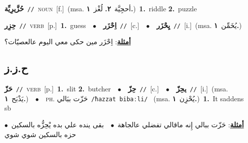 \documentclass[10pt,a4paper,twoside]{article} %
\begin{document}
\begin{multicols}{2}
{\setlength\topsep{0pt}\textbf{\foreignlanguage{arabic}{حُزَّيرِيِّة}}\ {\color{gray}\texttt{//}\color{black}}\ \textsc{noun}\ [f.]\ \color{gray}(msa. \foreignlanguage{arabic}{أحجِيَّة}~\foreignlanguage{arabic}{\textbf{٢.}}  \foreignlanguage{arabic}{لُغْز}~\foreignlanguage{arabic}{\textbf{١.}})\color{black}\ \textbf{1.}~riddle  \textbf{2.}~puzzle\ } \vspace{2mm}

{\setlength\topsep{0pt}\textbf{\foreignlanguage{arabic}{حِزِر}}\ {\color{gray}\texttt{//}\color{black}}\ \textsc{verb}\ [p.]\ \textbf{1.}~guess\ \ $\bullet$\ \ \setlength\topsep{0pt}\textbf{\foreignlanguage{arabic}{اِحْزَر}}\ {\color{gray}\texttt{//}\color{black}}\ [c.]\ \ $\bullet$\ \ \setlength\topsep{0pt}\textbf{\foreignlanguage{arabic}{يِحْزَر}}\ {\color{gray}\texttt{//}\color{black}}\ [i.]\ \color{gray}(msa. \foreignlanguage{arabic}{يُخَمِّن}~\foreignlanguage{arabic}{\textbf{١.}})\color{black}\  \begin{flushright}\color{gray}\foreignlanguage{arabic}{\textbf{\underline{\foreignlanguage{arabic}{أمثلة}}}: اِحْزَر مين حكى معي اليوم عالعصيّات؟}\end{flushright}\color{black}} \vspace{2mm}

\vspace{-3mm}
\subsection*{\color{blue}\foreignlanguage{arabic}{ح.ز.ز}\color{blue}{}} 

{\setlength\topsep{0pt}\textbf{\foreignlanguage{arabic}{حَزّ}}\ {\color{gray}\texttt{//}\color{black}}\ \textsc{verb}\ [p.]\ \textbf{1.}~slit  \textbf{2.}~butcher\ \ $\bullet$\ \ \setlength\topsep{0pt}\textbf{\foreignlanguage{arabic}{حِزّ}}\ {\color{gray}\texttt{//}\color{black}}\ [c.]\ \ $\bullet$\ \ \setlength\topsep{0pt}\textbf{\foreignlanguage{arabic}{يحِزّ}}\ {\color{gray}\texttt{//}\color{black}}\ [i.]\ \color{gray}(msa. \foreignlanguage{arabic}{يَذْبَح}~\foreignlanguage{arabic}{\textbf{١.}})\color{black}\ \ $\bullet$\ \ \textsc{ph.} \color{gray} \foreignlanguage{arabic}{حَزّت ببَالي}\color{black}\ {\color{gray}\texttt{/{\sffamily ħazzat bibaːli}/}\color{black}}\ \color{gray} (msa. \foreignlanguage{arabic}{يُحْزِن}~\foreignlanguage{arabic}{\textbf{١.}})\color{black}\ \textbf{1.}~It saddens sb\  \begin{flushright}\color{gray}\foreignlanguage{arabic}{\textbf{\underline{\foreignlanguage{arabic}{أمثلة}}}: حَزّت ببالي إِنه ماقالي تفضلي عالجاهة\ $\bullet$\ \  بقى ينده علي بده يْحِزُّه بالسكين\ $\bullet$\ \  حزه بالسكين شوي شوي}\end{flushright}\color{black}} \vspace{2mm}


\end{multicols}
\end{document}
